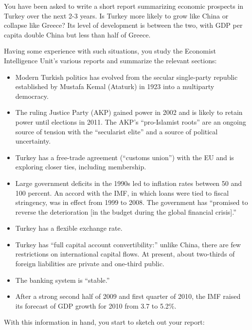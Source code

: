 \documentclass[letterpaper,12pt]{exam}
\begin{document}
\begin{questions}
You have been asked to write a short report summarizing 
economic prospects in Turkey over the next 2-3 years.  
Is Turkey more likely to grow like China or collapse like Greece?  
Its level of development is between the two, 
with GDP per capita double China but less than half of Greece. 

Having some experience with such situations, 
you study the Economist Intelligence Unit's 
various reports and summarize the relevant sections:  
%
\begin{itemize}
\item Modern Turkish politics has evolved from the secular 
single-party republic established by Mustafa Kemal (Ataturk) in 1923 into 
a multiparty democracy.  

\item The ruling Justice Party (AKP) gained power in 2002 and is likely to retain power until elections in 2011.  
    The AKP's ``pro-Islamist roots'' are an ongoing source of tension
    with the ``secularist elite'' and a source of 
    political uncertainty.  

\item Turkey has a free-trade agreement (``customs union'') 
with the EU and is exploring closer ties, including membership.  

\item Large government deficits in the 1990s led to inflation rates between 50 and 100 percent. 
    An accord with the IMF, in which loans were tied to fiscal stringency,
    was in effect from 1999 to 2008.  
    The government has ``promised to reverse the deterioration [in 
    the budget during the global financial crisis].''
    
\item Turkey has a flexible exchange rate.  

\item Turkey has ``full capital account convertibility:''
unlike China, there are few restrictions on international capital flows.  
At present, about two-thirds of foreign liabilities are private 
and one-third public.  

\item The banking system is ``stable.'' 

\item After a strong second half of 2009 and first quarter of 2010, 
the IMF raised its forecast of GDP growth for 2010 from 3.7 to 5.2\%.  
\end{itemize}

With this information in hand, you start to sketch out your report:  
\begin{parts}

\end{parts}
\end{questions}
\end{document}
